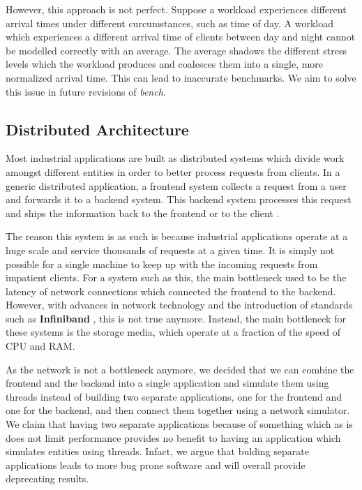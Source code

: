 \documentclass[10pt, author, twocolumn]{article}
\begin{document}
However, this approach is not perfect. Suppose a workload experiences different arrival times under different curcumstances, such as time of day. A workload which experiences a different arrival time of clients between day and night cannot be modelled correctly with an average. The average shadows the different stress levels which the workload produces and coalesces them into a single, more normalized arrival time. This can lead to inaccurate benchmarks. We aim to solve this issue in future revisions of \textit{bench}.

\subsection{Distributed Architecture}
Most industrial applications are built as distributed systems which divide work amongst different entities in order to better process requests from clients. In a generic distributed application, a frontend system collects a request from a user and forwards it to a backend system. This backend system processes this request and ships the information back to the frontend or to the client \cite{tanenbaum2007distributed}. 

The reason this system is as such is because industrial applications operate at a huge scale and service thousands of requests at a given time. It is simply not possible for a single machine to keep up with the incoming requests from impatient clients. For a system such as this, the main bottleneck used to be the latency of network connections which connected the frontend to the backend. However, with advances in network technology and the introduction of standards such as \textbf{Infiniband} \cite{pfister2001introduction}, this is not true anymore. Instead, the main bottleneck for these systems is the storage media, which operate at a fraction of the speed of CPU and RAM. 

As the network is not a bottleneck anymore, we decided that we can combine the frontend and the backend into a single application and simulate them using threads instead of building two separate applications, one for the frontend and one for the backend, and then connect them together using a network simulator. We claim that having two separate applications because of something which as is does not limit performance provides no benefit to having an application which simulates entities using threads. Infact, we argue that bulding separate applications leads to more bug prone software and will overall provide deprecating results. 
\end{document}
